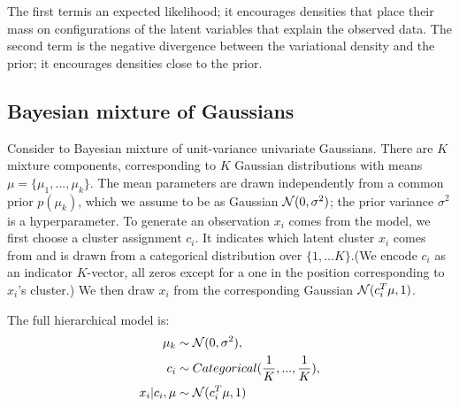 The first termis an expected likelihood; it encourages densities
that place their mass on configurations of the latent variables
that explain the observed data. The second term is the negative
divergence between the variational density and the prior; it encourages
densities close to the prior.

\subsection{Bayesian mixture of Gaussians}
Consider to Bayesian mixture of unit-variance univariate Gaussians. There are $K$ mixture components, corresponding to $K$ Gaussian
distributions with means $\mu = \{\mu_1,...,\mu_k\}$. The mean parameters are drawn independently from a common prior $p(\mu_k)$, which
we assume to be as Gaussian $\mathcal{N}(0, \sigma^2)$; the prior variance $\sigma^2$ is a hyperparameter. To generate an observation $x_i$ comes
from the model, we first choose a cluster assignment $c_i$. It indicates which latent cluster $x_i$ comes from and is drawn from a categorical
distribution over $\{1,...K\}$.(We encode $c_i$ as an indicator $K$-vector, all zeros except for a one in the position corresponding to $x_i$'s cluster.)
We then draw $x_i$ from the corresponding Gaussian $\mathcal{N}(c_i^T\mu, 1)$.

The full hierarchical model is:
\begin{equation}
    \begin{split}
        \mu_k &\sim \mathcal{N}(0, \sigma^2), \\
        c_i &\sim Categorical(\frac{1}{K}, ..., \frac{1}{K}), \\
        x_i|c_i, \mu &\sim \mathcal{N}(c_i^T\mu, 1)
    \end{split}
\end{equation}
